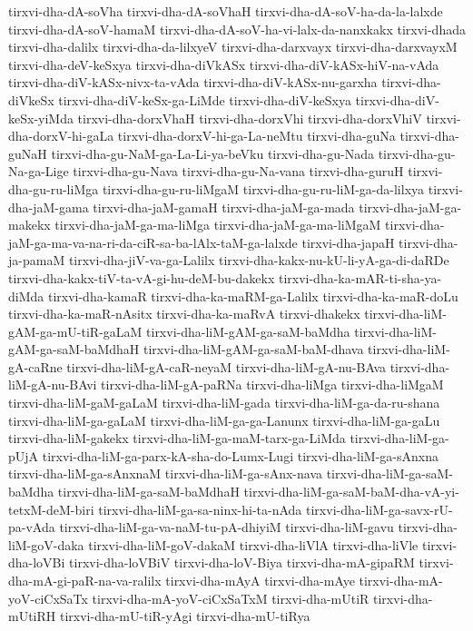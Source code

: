 {tirxvi-dha-dA-soVha
tirxvi-dha-dA-soVhaH
tirxvi-dha-dA-soV-ha-da-la-lalxde
tirxvi-dha-dA-soV-hamaM
tirxvi-dha-dA-soV-ha-vi-lalx-da-nanxkakx
tirxvi-dhada
tirxvi-dha-dalilx
tirxvi-dha-da-lilxyeV
tirxvi-dha-darxvayx
tirxvi-dha-darxvayxM
tirxvi-dha-deV-keSxya
tirxvi-dha-diVkASx
tirxvi-dha-diV-kASx-hiV-na-vAda
tirxvi-dha-diV-kASx-nivx-ta-vAda
tirxvi-dha-diV-kASx-nu-garxha
tirxvi-dha-diVkeSx
tirxvi-dha-diV-keSx-ga-LiMde
tirxvi-dha-diV-keSxya
tirxvi-dha-diV-keSx-yiMda
tirxvi-dha-dorxVhaH
tirxvi-dha-dorxVhi
tirxvi-dha-dorxVhiV
tirxvi-dha-dorxV-hi-gaLa
tirxvi-dha-dorxV-hi-ga-La-neMtu
tirxvi-dha-guNa
tirxvi-dha-guNaH
tirxvi-dha-gu-NaM-ga-La-Li-ya-beVku
tirxvi-dha-gu-Nada
tirxvi-dha-gu-Na-ga-Lige
tirxvi-dha-gu-Nava
tirxvi-dha-gu-Na-vana
tirxvi-dha-guruH
tirxvi-dha-gu-ru-liMga
tirxvi-dha-gu-ru-liMgaM
tirxvi-dha-gu-ru-liM-ga-da-lilxya
tirxvi-dha-jaM-gama
tirxvi-dha-jaM-gamaH
tirxvi-dha-jaM-ga-mada
tirxvi-dha-jaM-ga-makekx
tirxvi-dha-jaM-ga-ma-liMga
tirxvi-dha-jaM-ga-ma-liMgaM
tirxvi-dha-jaM-ga-ma-va-na-ri-da-ciR-sa-ba-lAlx-taM-ga-lalxde
tirxvi-dha-japaH
tirxvi-dha-ja-pamaM
tirxvi-dha-jiV-va-ga-Lalilx
tirxvi-dha-kakx-nu-kU-li-yA-ga-di-daRDe
tirxvi-dha-kakx-tiV-ta-vA-gi-hu-deM-bu-dakekx
tirxvi-dha-ka-mAR-ti-sha-ya-diMda
tirxvi-dha-kamaR
tirxvi-dha-ka-maRM-ga-Lalilx
tirxvi-dha-ka-maR-doLu
tirxvi-dha-ka-maR-nAsitx
tirxvi-dha-ka-maRvA
tirxvi-dhakekx
tirxvi-dha-liM-gAM-ga-mU-tiR-gaLaM
tirxvi-dha-liM-gAM-ga-saM-baMdha
tirxvi-dha-liM-gAM-ga-saM-baMdhaH
tirxvi-dha-liM-gAM-ga-saM-baM-dhava
tirxvi-dha-liM-gA-caRne
tirxvi-dha-liM-gA-caR-neyaM
tirxvi-dha-liM-gA-nu-BAva
tirxvi-dha-liM-gA-nu-BAvi
tirxvi-dha-liM-gA-paRNa
tirxvi-dha-liMga
tirxvi-dha-liMgaM
tirxvi-dha-liM-gaM-gaLaM
tirxvi-dha-liM-gada
tirxvi-dha-liM-ga-da-ru-shana
tirxvi-dha-liM-ga-gaLaM
tirxvi-dha-liM-ga-ga-Lanunx
tirxvi-dha-liM-ga-gaLu
tirxvi-dha-liM-gakekx
tirxvi-dha-liM-ga-maM-tarx-ga-LiMda
tirxvi-dha-liM-ga-pUjA
tirxvi-dha-liM-ga-parx-kA-sha-do-Lumx-Lugi
tirxvi-dha-liM-ga-sAnxna
tirxvi-dha-liM-ga-sAnxnaM
tirxvi-dha-liM-ga-sAnx-nava
tirxvi-dha-liM-ga-saM-baMdha
tirxvi-dha-liM-ga-saM-baMdhaH
tirxvi-dha-liM-ga-saM-baM-dha-vA-yi-tetxM-deM-biri
tirxvi-dha-liM-ga-sa-ninx-hi-ta-nAda
tirxvi-dha-liM-ga-savx-rU-pa-vAda
tirxvi-dha-liM-ga-va-naM-tu-pA-dhiyiM
tirxvi-dha-liM-gavu
tirxvi-dha-liM-goV-daka
tirxvi-dha-liM-goV-dakaM
tirxvi-dha-liVlA
tirxvi-dha-liVle
tirxvi-dha-loVBi
tirxvi-dha-loVBiV
tirxvi-dha-loV-Biya
tirxvi-dha-mA-gipaRM
tirxvi-dha-mA-gi-paR-na-va-ralilx
tirxvi-dha-mAyA
tirxvi-dha-mAye
tirxvi-dha-mA-yoV-ciCxSaTx
tirxvi-dha-mA-yoV-ciCxSaTxM
tirxvi-dha-mUtiR
tirxvi-dha-mUtiRH
tirxvi-dha-mU-tiR-yAgi
tirxvi-dha-mU-tiRya
}
